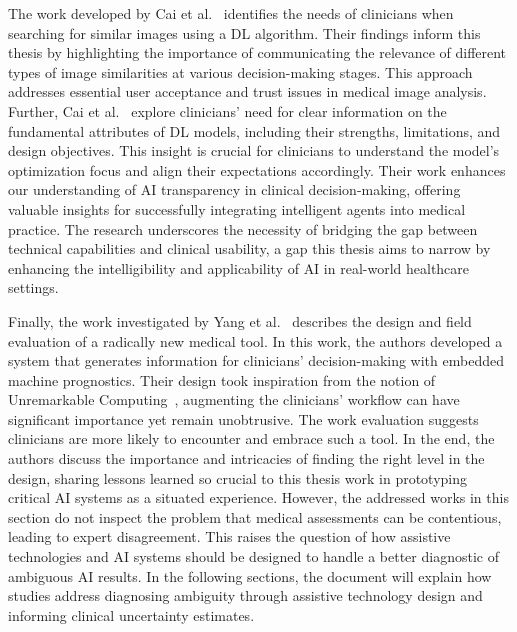 \textcolor{revised}{The work developed by Cai et al.~\cite{10.1145/3290605.3300234} identifies the needs of clinicians when searching for similar images using a \ac{DL} algorithm.
Their findings inform this thesis by highlighting the importance of communicating the relevance of different types of image similarities at various decision-making stages.
This approach addresses essential user acceptance and trust issues in medical image analysis.
Further, Cai et al.~\cite{10.1145/3359206} explore clinicians' need for clear information on the fundamental attributes of \ac{DL} models, including their strengths, limitations, and design objectives.
This insight is crucial for clinicians to understand the model's optimization focus and align their expectations accordingly.
Their work enhances our understanding of \ac{AI} transparency in clinical decision-making, offering valuable insights for successfully integrating intelligent agents into medical practice.
The research underscores the necessity of bridging the gap between technical capabilities and clinical usability, a gap this thesis aims to narrow by enhancing the intelligibility and applicability of \ac{AI} in real-world healthcare settings.}

Finally, the work investigated by Yang et al.~\cite{10.1145/3290605.3300468} describes the design and field evaluation of a radically new medical tool.
\textcolor{revised}{In this work, the authors developed a system that generates information for clinicians' decision-making with embedded machine prognostics.}
Their design took inspiration from the notion of Unremarkable Computing~\cite{Crabtree2020}, augmenting the clinicians' workflow can have significant importance yet remain unobtrusive.
The work evaluation suggests clinicians are more likely to encounter and embrace such a tool.
In the end, the authors discuss the importance and intricacies of finding the right level in the design, sharing lessons learned so crucial to this thesis work in prototyping critical \ac{AI} systems as a situated experience.
However, the addressed works in this section do not inspect the problem that medical assessments can be contentious, leading to expert disagreement.
This raises the question of how assistive technologies and \ac{AI} systems should be designed to handle a better diagnostic of ambiguous \ac{AI} results.
\textcolor{revised}{In the following sections, the document will explain how studies address diagnosing ambiguity through assistive technology design and informing clinical uncertainty estimates.}

